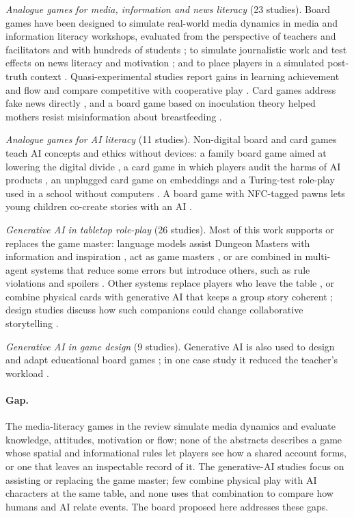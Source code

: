 \documentclass[12pt]{article}
\begin{document}
\emph{Analogue games for media, information and news literacy} (23 studies).
Board games have been designed to simulate real-world media dynamics in
media and information literacy workshops, evaluated from the perspective of
teachers and facilitators \parencite{revtab01} and with hundreds of students
\parencite{revtab02}; to simulate journalistic work and test effects on news
literacy and motivation \parencite{revtab03}; and to place players in a
simulated post-truth context \parencite{revtab42}. Quasi-experimental studies
report gains in learning achievement and flow \parencite{revtab57} and compare
competitive with cooperative play \parencite{revtab51}. Card games address
fake news directly \parencite{revtab59,revtab62}, and a board game based on
inoculation theory helped mothers resist misinformation about breastfeeding
\parencite{revtab68}.

\emph{Analogue games for AI literacy} (11 studies). Non-digital board and card
games teach AI concepts and ethics without devices: a family board game aimed
at lowering the digital divide \parencite{revtab20}, a card game in which
players audit the harms of AI products \parencite{revtab48}, an unplugged
card game on embeddings \parencite{revtab07} and a Turing-test role-play used
in a school without computers \parencite{revtab17}. A board game with
NFC-tagged pawns lets young children co-create stories with an AI
\parencite{revtab36}.

\emph{Generative AI in tabletop role-play} (26 studies). Most of this work
supports or replaces the game master: language models assist Dungeon Masters
with information and inspiration \parencite{revtab49}, act as game masters
\parencite{revtab52}, or are combined in multi-agent systems that reduce some
errors but introduce others, such as rule violations and spoilers
\parencite{revtab34}. Other systems replace players who leave the table
\parencite{revtab21}, or combine physical cards with generative AI that keeps
a group story coherent \parencite{revtab06}; design studies discuss how such
companions could change collaborative storytelling \parencite{revtab55}.

\emph{Generative AI in game design} (9 studies). Generative AI is also used to
design and adapt educational board games \parencite{revtab53}; in one case
study it reduced the teacher's workload \parencite{revtab39}.

\paragraph{Gap.} The media-literacy games in the review simulate media
dynamics and evaluate knowledge, attitudes, motivation or flow; none of the
abstracts describes a game whose spatial and informational rules let players
see how a shared account forms, or one that leaves an inspectable record of
it. The generative-AI studies focus on assisting or replacing the game
master; few combine physical play with AI characters at the same table, and
none uses that combination to compare how humans and AI relate events. The
board proposed here addresses these gaps.
\end{document}
